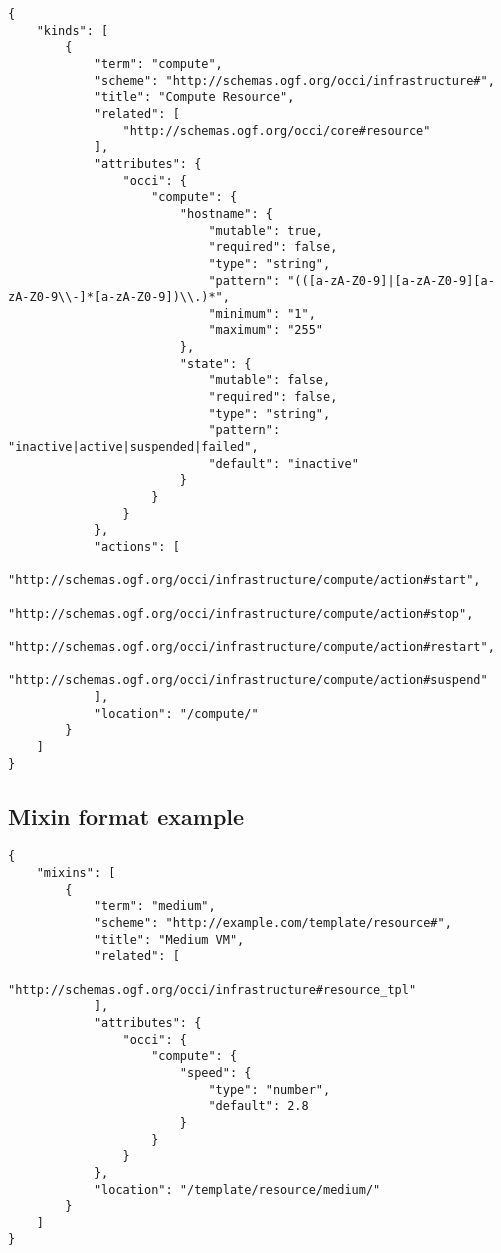 \documentclass[10pt,a4paper]{article}
\begin{document}
\begin{verbatim}
{
    "kinds": [
        {
            "term": "compute",
            "scheme": "http://schemas.ogf.org/occi/infrastructure#",
            "title": "Compute Resource",
            "related": [
                "http://schemas.ogf.org/occi/core#resource"
            ],
            "attributes": {
                "occi": {
                    "compute": {
                        "hostname": {
                            "mutable": true,
                            "required": false,
                            "type": "string",
                            "pattern": "(([a-zA-Z0-9]|[a-zA-Z0-9][a-zA-Z0-9\\-]*[a-zA-Z0-9])\\.)*",
                            "minimum": "1",
                            "maximum": "255"
                        },
                        "state": {
                            "mutable": false,
                            "required": false,
                            "type": "string",
                            "pattern": "inactive|active|suspended|failed",
                            "default": "inactive"
                        }
                    }
                }
            },
            "actions": [
                "http://schemas.ogf.org/occi/infrastructure/compute/action#start",
                "http://schemas.ogf.org/occi/infrastructure/compute/action#stop",
                "http://schemas.ogf.org/occi/infrastructure/compute/action#restart",
                "http://schemas.ogf.org/occi/infrastructure/compute/action#suspend"
            ],
            "location": "/compute/"
        }
    ]
}
\end{verbatim}

\subsection{Mixin format example}
\label{sec:example_mixin}

\begin{verbatim}
{
    "mixins": [
        {
            "term": "medium",
            "scheme": "http://example.com/template/resource#",
            "title": "Medium VM",
            "related": [
                "http://schemas.ogf.org/occi/infrastructure#resource_tpl"
            ],
            "attributes": {
                "occi": {
                    "compute": {
                        "speed": {
                            "type": "number",
                            "default": 2.8
                        }
                    }
                }
            },
            "location": "/template/resource/medium/"
        }
    ]
}
\end{verbatim}
\end{document}
